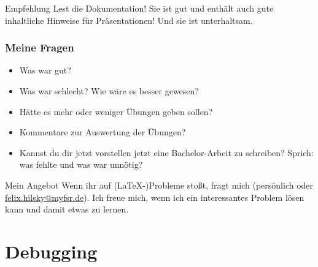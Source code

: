 




\begin{slide}
  \begin{block}{Empfehlung}
    Lest die Dokumentation! Sie ist gut und enthält auch gute inhaltliche Hinweise für Präsentationen! Und sie ist unterhaltsam.
  \end{block}
\end{slide}

\begin{slide}
  \frametitle{Meine Fragen}
  \begin{itemize}
    \item Was war gut?
    \item Was war schlecht? Wie wäre es besser gewesen?
    \item Hätte es mehr oder weniger Übungen geben sollen?
    \item Kommentare zur Auswertung der Übungen?
    \item Kannst du dir jetzt vorstellen jetzt eine Bachelor-Arbeit zu schreiben? Sprich: was fehlte und was war unnötig?
  \end{itemize}
  \begin{block}{Mein Angebot}
    Wenn ihr auf (\LaTeX-)Probleme stoßt, fragt mich (persönlich oder \url{felix.hilsky@myfsr.de}). Ich freue mich, wenn ich ein interessantes Problem lösen kann und damit etwas zu lernen.
  \end{block}

\end{slide}

\appendix
\section{Debugging}

